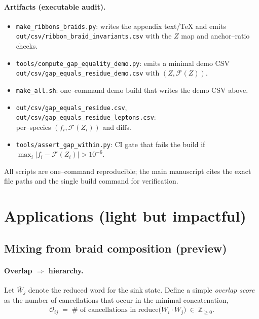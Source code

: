 \documentclass[epjc3]{svjour3}
\begin{document}
\paragraph{Artifacts (executable audit).}
\begin{itemize}
  \item \texttt{make\_ribbons\_braids.py}: writes the appendix text/TeX and emits \texttt{out/csv/ribbon\_braid\_invariants.csv} with the $Z$ map and anchor--ratio checks.
  \item \texttt{tools/compute\_gap\_equality\_demo.py}: emits a minimal demo CSV \texttt{out/csv/gap\_equals\_residue\_demo.csv} with $(Z,\mathcal F(Z))$.
  \item \texttt{make\_all.sh}: one--command demo build that writes the demo CSV above.
  \item \texttt{out/csv/gap\_equals\_residue.csv},
\texttt{out/csv/gap\_equals\_residue\_leptons.csv}: \\
    per--species $(f_i,\mathcal F(Z_i))$ and diffs.
  \item \texttt{tools/assert\_gap\_within.py}: CI gate that fails the build if $\max_i |f_i-\mathcal F(Z_i)|>10^{-6}$.
\end{itemize}
All scripts are one--command reproducible; the main manuscript cites the exact file paths and the single build command for verification.

\section{Applications (light but impactful)}

\subsection{Mixing from braid composition (preview)}
\paragraph{Overlap $\Rightarrow$ hierarchy.}
Let $\overline W_j$ denote the reduced word for the sink state. Define a simple \emph{overlap score} as the number of cancellations that occur in the minimal concatenation,
\begin{equation}
  \mathcal O_{ij} \;=\; \#\text{ of cancellations in } \mathrm{reduce}\!\bigl(W_i\cdot \overline W_j\bigr)\ \in \ \mathbb{Z}_{\ge 0}.
\end{equation}
\end{document}
